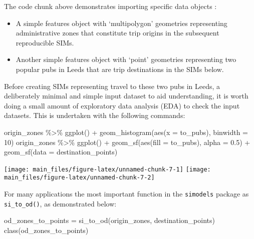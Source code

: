 \documentclass[11pt,letterpaper]{article}
\newenvironment{Shaded}{\begin{snugshade}}{\end{snugshade}}
\newcommand{\AttributeTok}[1]{\textcolor[rgb]{0.77,0.63,0.00}{#1}}
\newcommand{\DecValTok}[1]{\textcolor[rgb]{0.00,0.00,0.81}{#1}}
\newcommand{\FloatTok}[1]{\textcolor[rgb]{0.00,0.00,0.81}{#1}}
\newcommand{\FunctionTok}[1]{\textcolor[rgb]{0.00,0.00,0.00}{#1}}
\newcommand{\NormalTok}[1]{#1}
\newcommand{\OtherTok}[1]{\textcolor[rgb]{0.56,0.35,0.01}{#1}}
\newcommand{\SpecialCharTok}[1]{\textcolor[rgb]{0.00,0.00,0.00}{#1}}
\begin{document}
The code chunk above demonstrates importing specific data objects :

\begin{itemize}
\item
  A simple features object with `multipolygon' geometries representing administrative zones that constitute trip origins in the subsequent reproducible SIMs.
\item
  Another simple features object with `point' geometries representing two popular pubs in Leeds that are trip destinations in the SIMs below.
\end{itemize}

Before creating SIMs representing travel to these two pubs in Leeds, a deliberately minimal and simple input dataset to aid understanding, it is worth doing a small amount of exploratory data analysis (EDA) to check the input datasets.
This is undertaken with the following commands:

\begin{Shaded}
\begin{Highlighting}[]
\NormalTok{origin\_zones }\SpecialCharTok{\%\textgreater{}\%} 
  \FunctionTok{ggplot}\NormalTok{() }\SpecialCharTok{+}
  \FunctionTok{geom\_histogram}\NormalTok{(}\FunctionTok{aes}\NormalTok{(}\AttributeTok{x =}\NormalTok{ to\_pubs), }\AttributeTok{binwidth =} \DecValTok{10}\NormalTok{)}
\NormalTok{origin\_zones }\SpecialCharTok{\%\textgreater{}\%} 
  \FunctionTok{ggplot}\NormalTok{() }\SpecialCharTok{+}
  \FunctionTok{geom\_sf}\NormalTok{(}\FunctionTok{aes}\NormalTok{(}\AttributeTok{fill =}\NormalTok{ to\_pubs), }\AttributeTok{alpha =} \FloatTok{0.5}\NormalTok{) }\SpecialCharTok{+}
  \FunctionTok{geom\_sf}\NormalTok{(}\AttributeTok{data =}\NormalTok{ destination\_points)}
\end{Highlighting}
\end{Shaded}

\texttt{[image: main\_files/figure-latex/unnamed-chunk-7-1]} \texttt{[image: main\_files/figure-latex/unnamed-chunk-7-2]}

For many applications the most important function in the \texttt{simodels} package as \texttt{si\_to\_od()}, as demonstrated below:

\begin{Shaded}
\begin{Highlighting}[]
\NormalTok{od\_zones\_to\_points }\OtherTok{=} \FunctionTok{si\_to\_od}\NormalTok{(origin\_zones, destination\_points)}
\FunctionTok{class}\NormalTok{(od\_zones\_to\_points)}
\end{Highlighting}
\end{Shaded}
\end{document}
